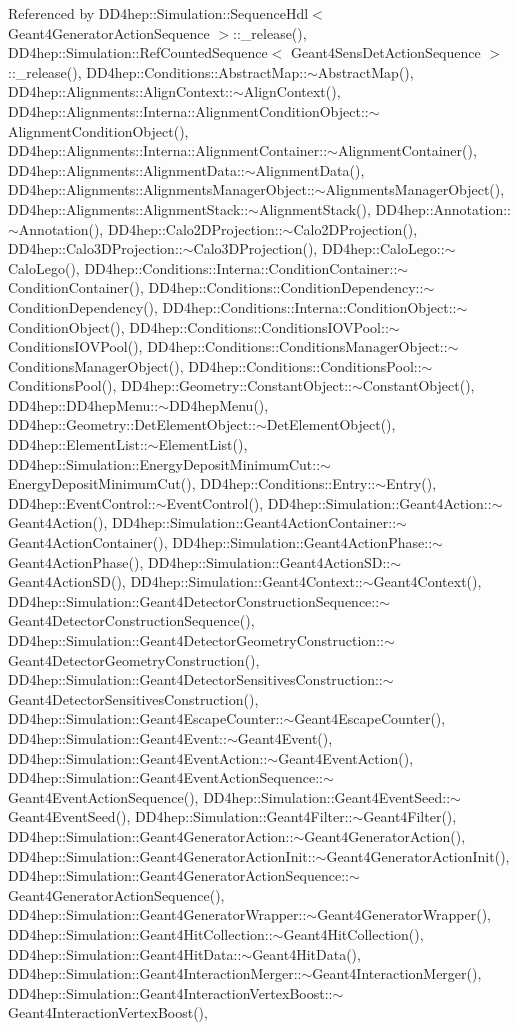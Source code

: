 Referenced by DD4hep::Simulation::SequenceHdl$<$ Geant4GeneratorActionSequence $>$::\_\-release(), DD4hep::Simulation::RefCountedSequence$<$ Geant4SensDetActionSequence $>$::\_\-release(), DD4hep::Conditions::AbstractMap::$\sim$AbstractMap(), DD4hep::Alignments::AlignContext::$\sim$AlignContext(), DD4hep::Alignments::Interna::AlignmentConditionObject::$\sim$AlignmentConditionObject(), DD4hep::Alignments::Interna::AlignmentContainer::$\sim$AlignmentContainer(), DD4hep::Alignments::AlignmentData::$\sim$AlignmentData(), DD4hep::Alignments::AlignmentsManagerObject::$\sim$AlignmentsManagerObject(), DD4hep::Alignments::AlignmentStack::$\sim$AlignmentStack(), DD4hep::Annotation::$\sim$Annotation(), DD4hep::Calo2DProjection::$\sim$Calo2DProjection(), DD4hep::Calo3DProjection::$\sim$Calo3DProjection(), DD4hep::CaloLego::$\sim$CaloLego(), DD4hep::Conditions::Interna::ConditionContainer::$\sim$ConditionContainer(), DD4hep::Conditions::ConditionDependency::$\sim$ConditionDependency(), DD4hep::Conditions::Interna::ConditionObject::$\sim$ConditionObject(), DD4hep::Conditions::ConditionsIOVPool::$\sim$ConditionsIOVPool(), DD4hep::Conditions::ConditionsManagerObject::$\sim$ConditionsManagerObject(), DD4hep::Conditions::ConditionsPool::$\sim$ConditionsPool(), DD4hep::Geometry::ConstantObject::$\sim$ConstantObject(), DD4hep::DD4hepMenu::$\sim$DD4hepMenu(), DD4hep::Geometry::DetElementObject::$\sim$DetElementObject(), DD4hep::ElementList::$\sim$ElementList(), DD4hep::Simulation::EnergyDepositMinimumCut::$\sim$EnergyDepositMinimumCut(), DD4hep::Conditions::Entry::$\sim$Entry(), DD4hep::EventControl::$\sim$EventControl(), DD4hep::Simulation::Geant4Action::$\sim$Geant4Action(), DD4hep::Simulation::Geant4ActionContainer::$\sim$Geant4ActionContainer(), DD4hep::Simulation::Geant4ActionPhase::$\sim$Geant4ActionPhase(), DD4hep::Simulation::Geant4ActionSD::$\sim$Geant4ActionSD(), DD4hep::Simulation::Geant4Context::$\sim$Geant4Context(), DD4hep::Simulation::Geant4DetectorConstructionSequence::$\sim$Geant4DetectorConstructionSequence(), DD4hep::Simulation::Geant4DetectorGeometryConstruction::$\sim$Geant4DetectorGeometryConstruction(), DD4hep::Simulation::Geant4DetectorSensitivesConstruction::$\sim$Geant4DetectorSensitivesConstruction(), DD4hep::Simulation::Geant4EscapeCounter::$\sim$Geant4EscapeCounter(), DD4hep::Simulation::Geant4Event::$\sim$Geant4Event(), DD4hep::Simulation::Geant4EventAction::$\sim$Geant4EventAction(), DD4hep::Simulation::Geant4EventActionSequence::$\sim$Geant4EventActionSequence(), DD4hep::Simulation::Geant4EventSeed::$\sim$Geant4EventSeed(), DD4hep::Simulation::Geant4Filter::$\sim$Geant4Filter(), DD4hep::Simulation::Geant4GeneratorAction::$\sim$Geant4GeneratorAction(), DD4hep::Simulation::Geant4GeneratorActionInit::$\sim$Geant4GeneratorActionInit(), DD4hep::Simulation::Geant4GeneratorActionSequence::$\sim$Geant4GeneratorActionSequence(), DD4hep::Simulation::Geant4GeneratorWrapper::$\sim$Geant4GeneratorWrapper(), DD4hep::Simulation::Geant4HitCollection::$\sim$Geant4HitCollection(), DD4hep::Simulation::Geant4HitData::$\sim$Geant4HitData(), DD4hep::Simulation::Geant4InteractionMerger::$\sim$Geant4InteractionMerger(), DD4hep::Simulation::Geant4InteractionVertexBoost::$\sim$Geant4InteractionVertexBoost(), 